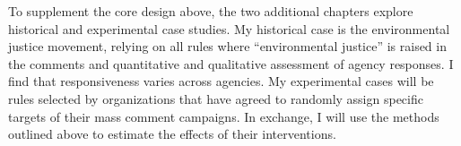 To supplement the core design above, the two additional chapters explore historical and experimental case studies. My historical case is the environmental justice movement, relying on all rules where ``environmental justice'' is raised in the comments and quantitative and qualitative assessment of agency responses. I find that responsiveness varies across agencies. My experimental cases will be rules selected by organizations that have agreed to randomly assign specific targets of their mass comment campaigns. In exchange, I will use the methods outlined above to estimate the effects of their interventions. 

